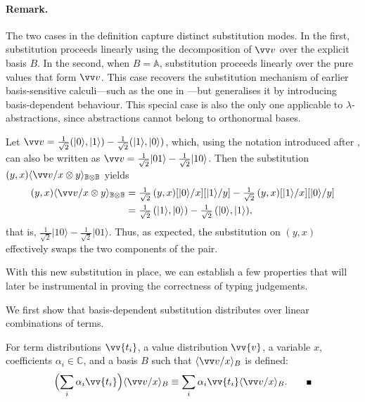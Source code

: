 \documentclass[runningheads,orivec,envcountsame,envcountsect]{llncs}
\providecommand{\qed}{\hbox{\rule{1ex}{1ex}}}%
\newcommand\ket[1]{\ensuremath{|#1\rangle}}
\newcommand\ansubst[2]{\ensuremath{\langle #1 \rangle_{#2}}}
\newcommand\AbsBasis{\ensuremath{\mathbb{A}}}
\def\C{\mathbb{C}}            %
\def\Pair#1#2{(#1,#2)} %
\newcommand\B{\mathbb B}
\begin{document}
\paragraph{Remark.}
The two cases in the definition capture distinct substitution modes.  
In the first, substitution proceeds linearly using the decomposition of
$\vv v$ over the explicit basis $B$.  
In the second, when $B=\AbsBasis$, substitution proceeds linearly over the pure
values that form $\vv v$.  
This case recovers the substitution mechanism of earlier
basis-sensitive calculi---such as the one in
\cite{DiazcaroGuillermoMiquelValironLICS19}---but generalises it by introducing
basis-dependent behaviour.  
This special case is also the only one applicable to
$\lambda$-abstractions, since abstractions cannot belong to orthonormal bases.


\begin{example}
  Let
  \(
    \vv v
    = \tfrac{1}{\sqrt{2}}\Pair{\ket{0}}{\ket{1}}
      - \tfrac{1}{\sqrt{2}}\Pair{\ket{1}}{\ket{0}}
    \),
  which, using the notation introduced after , can also be written as
  $\vv v = \tfrac{1}{\sqrt{2}}\ket{01}
           - \tfrac{1}{\sqrt{2}}\ket{10}$.
  Then the substitution
  $(y,x)\ansubst{\vv v/x\otimes y}{\B\otimes\B}$ yields
  \begin{align*}
    (y,x)\ansubst{\vv v/x\otimes y}{\B\otimes\B}
    &= \tfrac{1}{\sqrt{2}}\,(y,x)[\ket{0}/x][\ket{1}/y]
       - \tfrac{1}{\sqrt{2}}\,(y,x)[\ket{1}/x][\ket{0}/y] \\
    &= \tfrac{1}{\sqrt{2}}\,(\ket{1},\ket{0})
       - \tfrac{1}{\sqrt{2}}\,(\ket{0},\ket{1}),
  \end{align*}
  that is,
  $\tfrac{1}{\sqrt{2}}\ket{10}
   - \tfrac{1}{\sqrt{2}}\ket{01}$.
  Thus, as expected, the substitution on $(y,x)$ effectively swaps the two
  components of the pair.
\end{example}

With this new substitution in place, we can establish a few properties that
will later be instrumental in proving the correctness of typing judgements.

We first show that basis-dependent substitution distributes over linear
combinations of terms.

\begin{lemma}\label{lem:distributiveSubstitution}
  For term distributions $\vv{t_i}$, a value distribution $\vv{v}$, a
  variable $x$, coefficients $\alpha_i\in\C$, and a basis $B$ such that
  $\ansubst{\vv v/x}{B}$ is defined:
  \[
    \Bigl(\sum_i \alpha_i\vv{t_i}\Bigr)\ansubst{\vv v/x}{B}
    \equiv
    \sum_i \alpha_i\vv{t_i} \ansubst{\vv v/x}{B}.
    \tag*{\qed}
  \]
\end{lemma}
\end{document}
